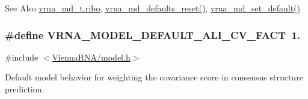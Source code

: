 \begin{DoxySeeAlso}{See Also}
\hyperlink{group__model__details_a3df2ae4bd9c133ef8ab92a53b1d035ec}{vrna\-\_\-md\-\_\-t.\-ribo}, \hyperlink{group__model__details_ga70834424cf804d149937de89f80ceb45}{vrna\-\_\-md\-\_\-defaults\-\_\-reset()}, \hyperlink{group__model__details_ga8ac6ff84936282436f822644bf841f66}{vrna\-\_\-md\-\_\-set\-\_\-default()} 
\end{DoxySeeAlso}
\hypertarget{group__model__details_gaaaf3d73d6abc18d3889676952bfedb96}{
\subsubsection[{V\-R\-N\-A\-\_\-\-M\-O\-D\-E\-L\-\_\-\-D\-E\-F\-A\-U\-L\-T\-\_\-\-A\-L\-I\-\_\-\-C\-V\-\_\-\-F\-A\-C\-T}]{\setlength{\rightskip}{0pt plus 5cm}\#define V\-R\-N\-A\-\_\-\-M\-O\-D\-E\-L\-\_\-\-D\-E\-F\-A\-U\-L\-T\-\_\-\-A\-L\-I\-\_\-\-C\-V\-\_\-\-F\-A\-C\-T~1.}}\label{group__model__details_gaaaf3d73d6abc18d3889676952bfedb96}


{\ttfamily \#include $<$\hyperlink{model_8h}{Vienna\-R\-N\-A/model.\-h}$>$}



Default model behavior for weighting the covariance score in consensus structure prediction. 


